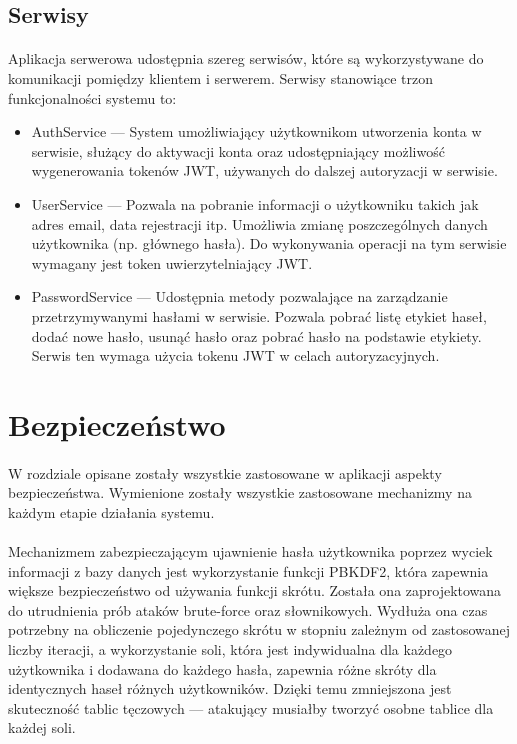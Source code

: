 \documentclass{article}
\begin{document}
    \subsection{Serwisy}
    \paragraph{} Aplikacja serwerowa udostępnia szereg serwisów, które są wykorzystywane do komunikacji pomiędzy klientem i serwerem. Serwisy stanowiące trzon funkcjonalności systemu to:
    \begin{itemize}
        \item AuthService --- System umożliwiający użytkownikom utworzenia konta w serwisie, służący do aktywacji konta oraz udostępniający możliwość wygenerowania tokenów JWT, używanych do dalszej autoryzacji w serwisie.
        \item UserService --- Pozwala na pobranie informacji o użytkowniku takich jak adres email, data rejestracji itp. Umożliwia zmianę poszczególnych danych użytkownika (np. głównego hasła). Do wykonywania operacji na tym serwisie wymagany jest token uwierzytelniający JWT.
        \item PasswordService --- Udostępnia metody pozwalające na zarządzanie przetrzymywanymi hasłami w serwisie. Pozwala pobrać listę etykiet haseł, dodać nowe hasło, usunąć hasło oraz pobrać hasło na podstawie etykiety. Serwis ten wymaga użycia tokenu JWT w celach autoryzacyjnych.
    \end{itemize}

    \section{Bezpieczeństwo}
    \paragraph{}W rozdziale opisane zostały wszystkie zastosowane w aplikacji aspekty bezpieczeństwa. Wymienione zostały wszystkie zastosowane mechanizmy na każdym etapie działania systemu.

    \paragraph{}Mechanizmem zabezpieczającym ujawnienie hasła użytkownika poprzez wyciek informacji z bazy danych jest wykorzystanie funkcji PBKDF2, która zapewnia większe bezpieczeństwo od używania funkcji skrótu. Została ona zaprojektowana do utrudnienia prób ataków brute-force oraz słownikowych. Wydłuża ona czas potrzebny na obliczenie pojedynczego skrótu w stopniu zależnym od zastosowanej liczby iteracji, a wykorzystanie soli, która jest indywidualna dla każdego użytkownika i dodawana do każdego hasła, zapewnia różne skróty dla identycznych haseł różnych użytkowników. Dzięki temu zmniejszona jest skuteczność tablic tęczowych --- atakujący musiałby tworzyć osobne tablice dla każdej soli.
\end{document}
